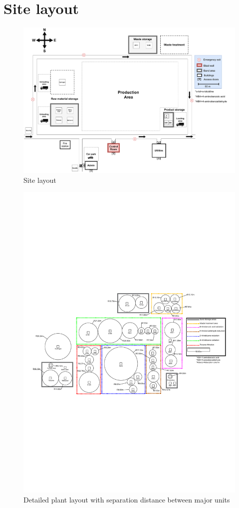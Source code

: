 \section{Site layout}

\begin{figure}[H]
    \centering
    \includegraphics[width=\linewidth]{chapters/Z-support/figures/Plant layout.pdf}
    \caption{Site layout}
    \label{fig:site}
\end{figure}

\begin{landscape}

\begin{figure}[H]
    \centering
    \includegraphics[width=\linewidth]{chapters/Z-support/figures/Separation distances 2.pdf}
    \caption{Detailed plant layout with separation distance between major units}
    \label{fig:detailed_layout}
\end{figure}

\end{landscape}
